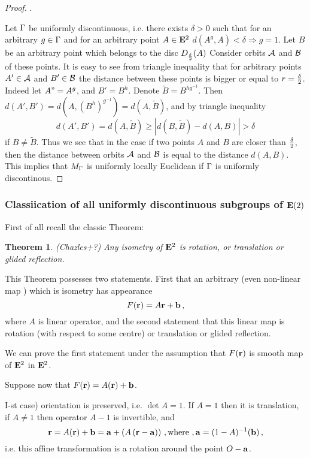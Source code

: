 \documentclass[12pt]{article}
\newtheorem{theorem}{Theorem}
\theoremstyle{definition}
\numberwithin{equation}{section}
\begin{document}
\begin{proof}.

Let ${\Gamma}$ be uniformly discontinuous, i.e.
there exists $\delta >0$ such that 
for an arbitrary $g\in {\Gamma}$
and for an arbitrary point $A\in {\bf E}^2$
         $d(A^g,A)<\delta \Rightarrow
   g=1$.
  Let $B$ be an arbitrary point  
which belongs to the disc $D_{\delta\over 2}(A)$
Consider orbits ${\cal A}$ and ${\cal B}$ of these points.
It is easy to see from triangle inequality that
for arbitrary points $A'\in{\cal A}$ and $B'\in {\cal B}$
the distance between these points is bigger or equal to
  $r={\delta\over 2}$. Indeed let $A"=A^g$, and 
$B'=B^h$. Denote $\tilde B=B^{hg^{-1}}$. Then
$d(A',B')=
d\left(A, \left(B^h\right)^{g^{-1}}\right)=
d\left(A, \tilde B\right)$, and by triangle inequality
     $$
d(A',B')=d(A,\tilde B)\geq \left|d(B,\tilde B)-d(A,B)\right|
>\delta
     $$
if $B\not=\tilde B$.
Thus we see that in the case if two points $A$
and $B$ are closer than $\delta\over 2$,
then the distance between orbits ${\cal A}$ and ${\cal B}$
is equal to the distance $d(A,B)$.
This implies  that $M_{\Gamma}$ is uniformly locally Euclidean
if ${\Gamma}$ is uniformly discontinous.




\end{proof}

\subsubsection {Classiication of all
uniformly discontinuous subgroups of ${\bf E}(2)$}


  First of all recall the classic Theorem:
 
\begin{theorem} (Chazles+?)
  Any isometry of ${\bf E}^2$ is rotation, or translation or
  glided reflection.
\end{theorem}

  This Theorem possesses two statements. First that an arbitrary
(even non-linear map ) which is isometry has appearance
            $$
   F({\bf r})=A{\bf r}+{\bf b}\,,
            $$ 
where $A$ is linear operator, and the second statement
that this linear map is rotation (with respect to some centre)
or translation or glided reflection.

    We can prove the first statement under the assumption that
  $F({\bf r})$ is smooth map of ${\bf E}^2$ in ${\bf E}^2$.


     Suppose now  that $F({\bf r})=A({\bf r})+{\bf b}$.
   
\smallskip

  I-st case) orientation is preserved, i.e. $\det A=1$.
If $A=1$ then it is translation, if $A\not=1$ then operator
$A-1$ is invertible, and
              $$
{\bf r}=A({\bf r})+{\bf b}={\bf a}+\left(A\left({\bf r}-{\bf a}\right)\right)\,,
{\rm where}\,\,,  {\bf a}= (1-A)^{-1}({\bf b})\,,
              $$
i.e. this affine transformation is a rotation around
the point $O-{\bf a}$.
\end{document}
